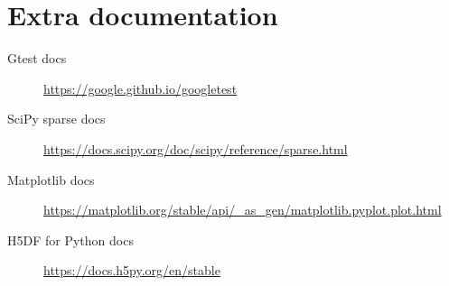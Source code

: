 \section{Extra documentation}

\begin{description}
	\item[Gtest docs]

	      \url{https://google.github.io/googletest}

	\item[SciPy sparse docs]

	      \url{https://docs.scipy.org/doc/scipy/reference/sparse.html}

	\item[Matplotlib docs]

	      \url{https://matplotlib.org/stable/api/_as_gen/matplotlib.pyplot.plot.html}

	\item[H5DF for Python docs]
	      \url{https://docs.h5py.org/en/stable}
\end{description}


\nocite{*}
\printbibliography[title={References}]
